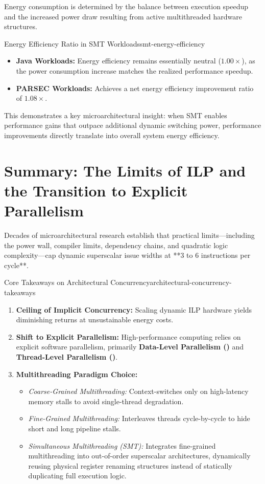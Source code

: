 Energy consumption is determined by the balance between execution speedup and the increased power draw resulting from active multithreaded hardware structures.

\begin{concept}{Energy Efficiency Ratio in SMT Workloads}{smt-energy-efficiency}
    \begin{itemize}
        \item \textbf{Java Workloads:} Energy efficiency remains essentially neutral ($1.00\times$), as the power consumption increase matches the realized performance speedup.
        \item \textbf{PARSEC Workloads:} Achieves a net energy efficiency improvement ratio of $1.08\times$. 
    \end{itemize}
    This demonstrates a key microarchitectural insight: when SMT enables performance gains that outpace additional dynamic switching power, performance improvements directly translate into overall system energy efficiency.
\end{concept}

\section{Summary: The Limits of ILP and the Transition to Explicit Parallelism}
\label{sec:ilp_summary_shift_to_tlp}

Decades of microarchitectural research establish that practical limits—including the power wall, compiler limits, dependency chains, and quadratic logic complexity—cap dynamic superscalar issue widths at **3 to 6 instructions per cycle**.

\begin{concept}{Core Takeaways on Architectural Concurrency}{architectural-concurrency-takeaways}
    \begin{enumerate}
        \item \textbf{Ceiling of Implicit Concurrency:} Scaling dynamic ILP hardware yields diminishing returns at unsustainable energy costs.
        \item \textbf{Shift to Explicit Parallelism:} High-performance computing relies on explicit software parallelism, primarily \textbf{Data-Level Parallelism ()} and \textbf{Thread-Level Parallelism ()}.
        \item \textbf{Multithreading Paradigm Choice:} 
        \begin{itemize}
            \item \textit{Coarse-Grained Multithreading:} Context-switches only on high-latency memory stalls to avoid single-thread degradation.
            \item \textit{Fine-Grained Multithreading:} Interleaves threads cycle-by-cycle to hide short and long pipeline stalls.
            \item \textit{Simultaneous Multithreading (SMT):} Integrates fine-grained multithreading into out-of-order superscalar architectures, dynamically reusing physical register renaming structures instead of statically duplicating full execution logic.
        \end{itemize}
    \end{enumerate}
\end{concept}